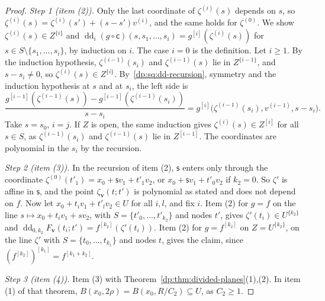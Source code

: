 \begin{proof}
\emph{Step 1 (item (2)).} Only the last coordinate of $\zeta^{(i)}(s)$ depends on $s$, so $\zeta^{(i)}(s)=\zeta^{(i)}(s')+(s-s')v^{(i)}$, and the same holds for $\zeta^{(0)}$. We show $\zeta^{(i)}(s)\in Z^{\{i\}}$ and $\operatorname{dd}_i(g\circ\mathsf c)(s,s_1,\dots,s_i)=g^{[i]}(\zeta^{(i)}(s))$ for $s\in S\setminus\{s_1,\dots,s_i\}$, by induction on $i$. The case $i=0$ is the definition. Let $i\ge1$. By the induction hypothesis, $\zeta^{(i-1)}(s_i)$ and $\zeta^{(i-1)}(s)$ lie in $Z^{\{i-1\}}$, and $s-s_i\ne0$, so $\zeta^{(i)}(s)\in Z^{\{i\}}$. By~\eqref{dp:sq:dd-recursion}, symmetry and the induction hypothesis at $s$ and at $s_i$, the left side is
\[
 \frac{g^{[i-1]}(\zeta^{(i-1)}(s))-g^{[i-1]}(\zeta^{(i-1)}(s_i))}{s-s_i}=g^{[i]}\bigl(\zeta^{(i-1)}(s_i),v^{(i-1)},s-s_i\bigr).
\]
Take $s=s_0$, $i=j$. If $Z$ is open, the same induction gives $\zeta^{(i)}(s)\in Z^{[i]}$ for all $s\in S$, as $\zeta^{(i-1)}(s_i)$ and $\zeta^{(i-1)}(s)$ lie in $Z^{[i-1]}$. The coordinates are polynomial in the $s_i$ by the recursion.

\emph{Step 2 (item (3)).} In the recursion of item (2), $\mathsf s$ enters only through the coordinate $\zeta^{(0)}(t'_1)=x_0+\mathsf sv_1+t'_1v_2$, or $x_0+\mathsf sv_1+t'_0v_2$ if $k_2=0$. So $\zeta'$ is affine in $\mathsf s$, and the point $\zeta_{\mathbf v}(t;t')$ is polynomial as stated and does not depend on $f$. Now let $x_0+t_iv_1+t'_lv_2\in U$ for all $i,l$, and fix $i$. Item (2) for $g=f$ on the line $s\mapsto x_0+t_iv_1+sv_2$, with $S=\{t'_0,\dots,t'_{k_2}\}$ and nodes $t'$, gives $\zeta'(t_i)\in U^{\{k_2\}}$ and $\operatorname{dd}_{0,k_2}F_{\mathbf v}(t_i;t')=f^{[k_2]}(\zeta'(t_i))$. Item (2) for $g=f^{[k_2]}$ on $Z=U^{\{k_2\}}$, on the line $\zeta'$ with $S=\{t_0,\dots,t_{k_1}\}$ and nodes $t$, gives the claim, since $(f^{[k_2]})^{[k_1]}=f^{[k_1+k_2]}$.

\emph{Step 3 (item (4)).} Item (3) with Theorem~\ref{dp:thm:divided-planes}(1),(2). In item (1) of that theorem, $B(x_0,2\rho)=B(x_0,R/C_2)\subseteq U$, as $C_2\ge1$.


\end{proof}
